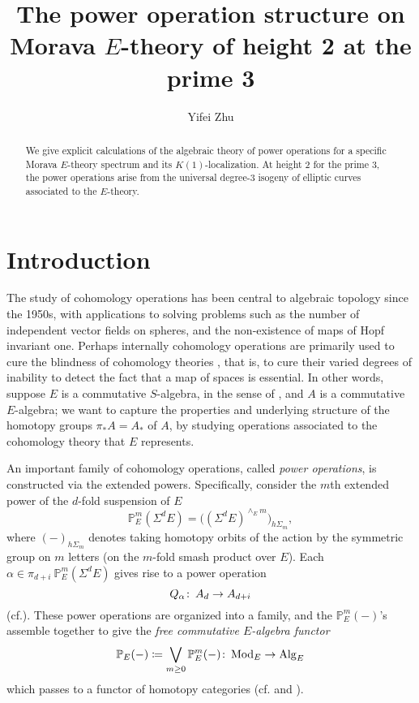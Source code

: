 \documentclass{gtpart}
\title{The power operation structure on Morava $E$-theory of height 2 at the prime 3}
\author{Yifei Zhu}
\theoremstyle{definition}
\theoremstyle{remark}
\def\co{\colon\thinspace}
\newcommand{\mb}[1]{\mathbb{#1}}
\newcommand{\Mod}{{\rm Mod}}
\newcommand{\Alg}{{\rm Alg}}
\newcommand{\cff}[2]{cf.\thinspace{\cite[#1]{#2}}}
\newcommand{\BP}{{\mb P}}
\newcommand{\A}{\alpha}
\begin{document}
\begin{abstract}
 We give explicit calculations of the algebraic theory of power operations for a specific Morava $E$-theory spectrum and its $K(1)$-localization.  
 At height 2 for the prime 3, the power operations arise from the universal degree-3 isogeny of elliptic curves associated to the $E$-theory.  
\end{abstract}


\maketitle
\section{Introduction}
\label{sec:intro}

The study of cohomology operations has been central to algebraic topology 
since the 1950s, with applications to solving problems such as the number of independent vector fields 
on spheres, and the non-existence of maps of Hopf invariant one.  
Perhaps internally cohomology operations are primarily used to cure the blindness of cohomology theories \cite{blind}, 
that is, to cure their varied degrees of inability to detect the fact that a map of spaces is essential.  
In other words, suppose $E$ is a commutative $S$-algebra, in the sense of \cite{EKMM}, and $A$ is a commutative $E$-algebra; 
we want to capture the properties and underlying structure of the homotopy groups $\pi_* A = A_*$ of $A$, 
by studying operations associated to the cohomology theory that $E$ represents.  

An important family of cohomology operations, called {\em power operations}, is constructed via the extended powers.  
Specifically, consider the $m$th extended power of the $d$-fold suspension of $E$ 
\[
 \BP_E^m (\Sigma^d E) = \big( (\Sigma^d E)^{\wedge_E m} \big)_{h \Sigma_m}, 
\]
where $(-)_{h \Sigma_m}$ denotes taking homotopy orbits of the action by the symmetric group on $m$ letters (on the $m$-fold smash product over $E$).  
Each $\A \in \pi_{d+i}~\BP_E^m (\Sigma^d E)$ gives rise to a power operation 
\[
 Q_\A \co A_d \to A_{d+i} 
\]
(\cff{Section IX.1}{H_infty}).  
These power operations are organized into a family, and the $\BP_E^m (-)$'s assemble together to give the {\em free commutative $E$-algebra functor} 
\[
 \BP_E (-) \coloneqq \bigvee_{m \geq 0} \BP_E^m (-) \co \Mod_E \to \Alg_E 
\]
which passes to a functor of homotopy categories (\cff{Section I.2}{H_infty} and \cite[3.15]{cong}).  
\end{document}
